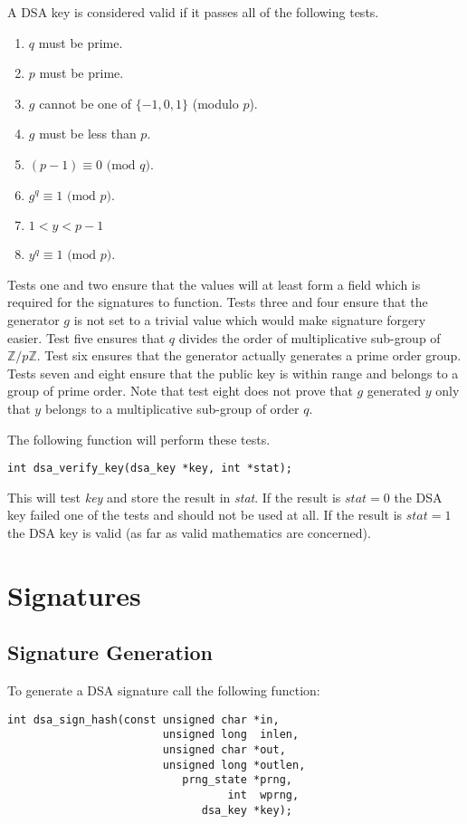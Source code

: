 \documentclass[synpaper]{book}
\def\Z{{\mathbb Z}}
\newcommand{\mysection}[1]    %
	{                   %
	\section{#1}
   \markboth{\textsf{www.libtom.org}}{\thesection ~ {#1}}
	}
\begin{document}
A DSA key is considered valid if it passes all of the following tests.

\begin{enumerate}
   \item $q$ must be prime.
   \item $p$ must be prime.
   \item $g$ cannot be one of $\lbrace -1, 0, 1 \rbrace$ (modulo $p$).
   \item $g$ must be less than $p$.
   \item $(p-1) \equiv 0 \mbox{ (mod }q\mbox{)}$.
   \item $g^q \equiv 1 \mbox{ (mod }p\mbox{)}$.
   \item $1 < y < p - 1$
   \item $y^q \equiv 1 \mbox{ (mod }p\mbox{)}$.
\end{enumerate}

Tests one and two ensure that the values will at least form a field which is required for the signatures to
function.  Tests three and four ensure that the generator $g$ is not set to a trivial value which would make signature
forgery easier.  Test five ensures that $q$ divides the order of multiplicative sub-group of $\Z/p\Z$. Test six
ensures that the generator actually generates a prime order group.  Tests seven and eight ensure that the public key
is within range and belongs to a group of prime order.  Note that test eight does not prove that $g$ generated $y$ only
that $y$ belongs to a multiplicative sub-group of order $q$.

The following function will perform these tests.

\begin{verbatim}
int dsa_verify_key(dsa_key *key, int *stat);
\end{verbatim}

This will test \textit{key} and store the result in \textit{stat}.  If the result is $stat = 0$ the DSA key failed one of the tests
and should not be used at all.  If the result is $stat = 1$ the DSA key is valid (as far as valid mathematics are concerned).

\mysection{Signatures}
\subsection{Signature Generation}
To generate a DSA signature call the following function:

\begin{verbatim}
int dsa_sign_hash(const unsigned char *in,
                        unsigned long  inlen,
                        unsigned char *out,
                        unsigned long *outlen,
                           prng_state *prng,
                                  int  wprng,
                              dsa_key *key);
\end{verbatim}
\end{document}

